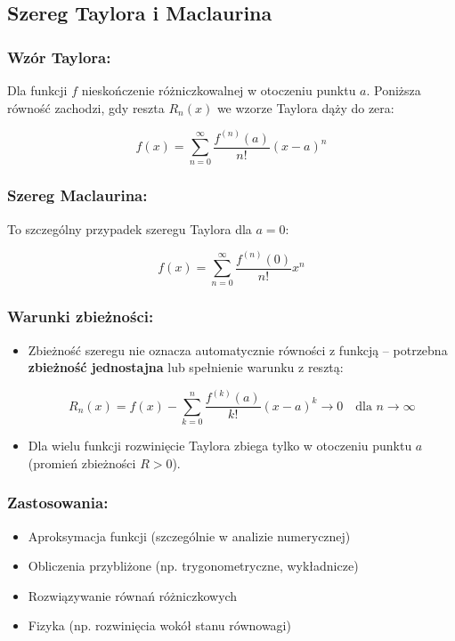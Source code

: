 \subsection{Szereg Taylora i Maclaurina}

\subsubsection*{Wzór Taylora:}
Dla funkcji $f$ nieskończenie różniczkowalnej w otoczeniu punktu $a$. Poniższa równość zachodzi, gdy reszta $R_n(x)$ we wzorze Taylora dąży do zera:

$$
f(x) = \sum_{n=0}^{\infty} \frac{f^{(n)}(a)}{n!}(x - a)^n
$$

\subsubsection*{Szereg Maclaurina:}
To szczególny przypadek szeregu Taylora dla $a = 0$:

$$
f(x) = \sum_{n=0}^{\infty} \frac{f^{(n)}(0)}{n!}x^n
$$

\subsubsection*{Warunki zbieżności:}
\begin{itemize}
    \item Zbieżność szeregu nie oznacza automatycznie równości z funkcją -- potrzebna \textbf{zbieżność jednostajna} lub spełnienie warunku z resztą:

  $$
  R_n(x) = f(x) - \sum_{k=0}^n \frac{f^{(k)}(a)}{k!}(x - a)^k \to 0 \quad \text{dla } n \to \infty
  $$
    \item Dla wielu funkcji rozwinięcie Taylora zbiega tylko w otoczeniu punktu $a$ (promień zbieżności $R > 0$).
\end{itemize}

\subsubsection*{Zastosowania:}
\begin{itemize}
    \item Aproksymacja funkcji (szczególnie w analizie numerycznej)
    \item Obliczenia przybliżone (np. trygonometryczne, wykładnicze)
    \item Rozwiązywanie równań różniczkowych
    \item Fizyka (np. rozwinięcia wokół stanu równowagi)
\end{itemize}

